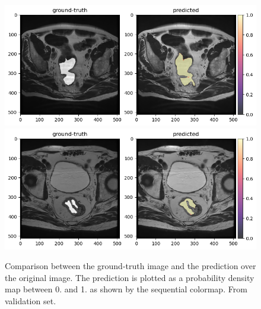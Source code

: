 \documentclass{standalone}
\begin{document}
\begin{figure}[htp]

    \centering
    \includegraphics[width=\textwidth]{../images/predoutputoverlapvalidation2.png}
    \includegraphics[width=\textwidth]{../images/predoutputoverlapvalidation3.png}
    
    
    \caption{Comparison between the ground-truth image and the prediction over the original image.
    The prediction is plotted as a probability density map between 0. and 1. as shown by the sequential colormap.
    From validation set.}\label{predoverlapvalidation2}

\end{figure}


\newpage
\end{document}
